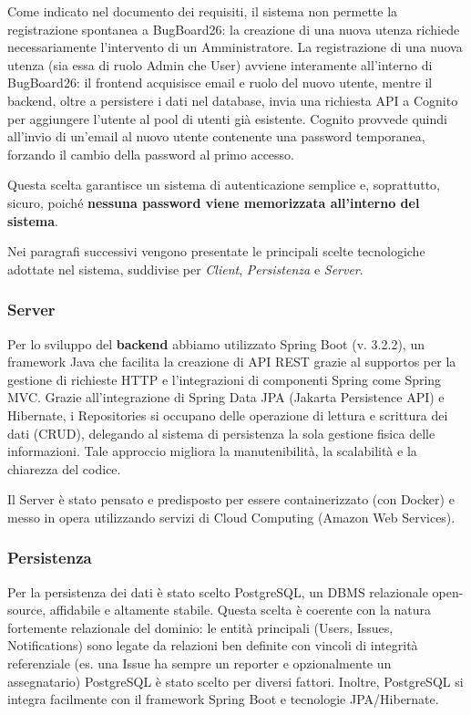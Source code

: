 \documentclass[a4paper,12pt]{article}
\begin{document}
Come indicato nel documento dei requisiti, il sistema non permette la registrazione spontanea a BugBoard26: la creazione di una nuova utenza richiede necessariamente l'intervento di un Amministratore. La registrazione di una nuova utenza (sia essa di ruolo Admin che User) avviene interamente all'interno di BugBoard26: il frontend acquisisce email e ruolo del nuovo utente, mentre il backend, oltre a persistere i dati nel database, invia una richiesta API a Cognito per aggiungere l'utente al pool di utenti già esistente. Cognito provvede quindi all'invio di un'email al nuovo utente contenente una password temporanea, forzando il cambio della password al primo accesso.

Questa scelta garantisce un sistema di autenticazione semplice e, soprattutto, sicuro, poiché \textbf{nessuna password viene memorizzata all'interno del sistema}.


Nei paragrafi successivi vengono presentate le principali scelte tecnologiche adottate nel sistema, suddivise per \textit{Client}, \textit{Persistenza} e \textit{Server}.



\subsubsection{Server} 
Per lo sviluppo del \textbf{backend} abbiamo utilizzato Spring Boot (v. 3.2.2), un framework Java che facilita la creazione di API REST grazie al supportos per la gestione di richieste HTTP e l'integrazioni di componenti Spring come Spring MVC. Grazie all'integrazione di Spring Data JPA (Jakarta Persistence API) e Hibernate, i Repositories si occupano delle operazione di lettura e scrittura dei dati (CRUD), delegando al sistema di persistenza la sola gestione fisica delle informazioni.
Tale approccio migliora la manutenibilità, la scalabilità e la chiarezza del codice.  

Il Server è stato pensato e predisposto per essere containerizzato (con Docker) e messo in opera utilizzando servizi di Cloud Computing (Amazon Web Services). 


\subsubsection{Persistenza} Per la persistenza dei dati è stato scelto PostgreSQL, un DBMS relazionale open-source, affidabile e altamente stabile. Questa scelta è coerente con la natura fortemente relazionale del dominio: le entità principali (Users, Issues, Notifications) sono legate da relazioni ben definite con vincoli di integrità referenziale (es. una Issue ha sempre un reporter e opzionalmente un assegnatario) PostgreSQL è stato scelto per diversi fattori. Inoltre, PostgreSQL si integra facilmente con il
framework Spring Boot e tecnologie JPA/Hibernate.  
\end{document}
